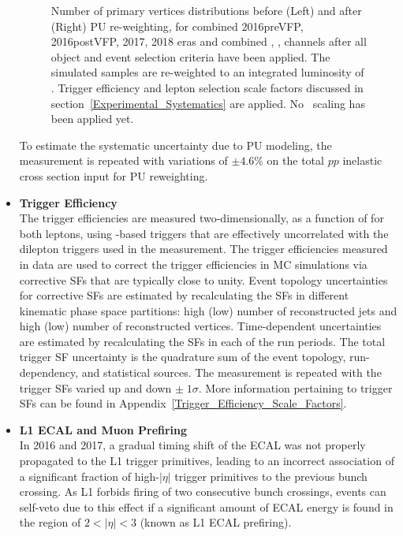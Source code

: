\begin{itemize}
\begin{figure}[htb]
\begin{center}
\begin{tabular}{cc}
        \end{tabular}
        \caption{\footnotesize Number of primary vertices distributions before (Left) and after (Right) PU re-weighting, for combined 2016preVFP, 2016postVFP, 2017, 2018 eras and combined \ee, \emu, \mumu channels after all object and event selection criteria have been applied.
        The simulated samples are re-weighted to an integrated luminosity of \lumivalueRuniiUL.
        Trigger efficiency and lepton selection scale factors discussed in section~\ref{Experimental_Systematics} are applied.
        No \zjets\ scaling has been applied yet.
        \label{PU_re-weighting}
        }
    \end{center}
\end{figure}
    To estimate the systematic uncertainty due to PU modeling, the measurement is repeated with variations of $\pm 4.6\%$ on the total $pp$ inelastic cross section input for PU reweighting.
    \item {\bf Trigger Efficiency} \\
    The trigger efficiencies are measured two-dimensionally, as a function of \pT for both leptons, using \ETmiss-based triggers that are effectively uncorrelated with the dilepton triggers used in the measurement. 
    The trigger efficiencies measured in data are used to correct the trigger efficiencies in MC simulations via corrective SFs that are typically close to unity. 
    Event topology uncertainties for corrective SFs are estimated by recalculating the SFs in different kinematic phase space partitions: high (low) number of reconstructed jets and high (low) number of reconstructed vertices.
    Time-dependent uncertainties are estimated by recalculating the SFs in each of the run periods.
    The total trigger SF uncertainty is the quadrature sum of the event topology, run-dependency, and statistical sources.
    The measurement is repeated with the trigger SFs varied up and down $\pm \; 1 \sigma$.
    More information pertaining to trigger SFs can be found in Appendix~\ref{Trigger_Efficiency_Scale_Factors}.
    \item {\bf L1 ECAL and Muon Prefiring} \\
    In 2016 and 2017, a gradual timing shift of the ECAL was not properly propagated to the L1 trigger primitives, leading to an incorrect association of a significant fraction of high-$\vert \eta \vert$ trigger primitives to the previous bunch crossing.
    As L1 forbids firing of two consecutive bunch crossings, events can self-veto due to this effect if a significant amount of ECAL energy is found in the region of $2<\vert \eta \vert<3$ (known as L1 ECAL prefiring).

\end{itemize}
